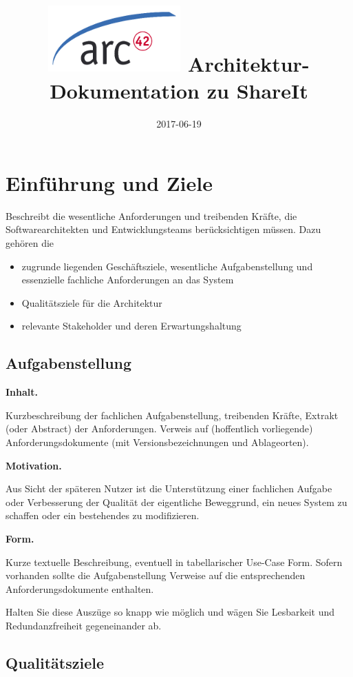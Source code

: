 \documentclass[]{article}
\title{\includegraphics{images/arc42-logo.png} Architektur-Dokumentation zu ShareIt}
\date{2017-06-19}
\begin{document}
\maketitle
\newpage
\section{Einführung und Ziele}\label{section-introduction-and-goals}

Beschreibt die wesentliche Anforderungen und treibenden Kräfte, die
Softwarearchitekten und Entwicklungsteams berücksichtigen müssen. Dazu
gehören die

\begin{itemize}
\item
  zugrunde liegenden Geschäftsziele, wesentliche Aufgabenstellung und
  essenzielle fachliche Anforderungen an das System
\item
  Qualitätsziele für die Architektur
\item
  relevante Stakeholder und deren Erwartungshaltung
\end{itemize}

\subsection{Aufgabenstellung}\label{_aufgabenstellung}

\textbf{Inhalt.}

Kurzbeschreibung der fachlichen Aufgabenstellung, treibenden Kräfte,
Extrakt (oder Abstract) der Anforderungen. Verweis auf (hoffentlich
vorliegende) Anforderungsdokumente (mit Versionsbezeichnungen und
Ablageorten).

\textbf{Motivation.}

Aus Sicht der späteren Nutzer ist die Unterstützung einer fachlichen
Aufgabe oder Verbesserung der Qualität der eigentliche Beweggrund, ein
neues System zu schaffen oder ein bestehendes zu modifizieren.

\textbf{Form.}

Kurze textuelle Beschreibung, eventuell in tabellarischer Use-Case Form.
Sofern vorhanden sollte die Aufgabenstellung Verweise auf die
entsprechenden Anforderungsdokumente enthalten.

Halten Sie diese Auszüge so knapp wie möglich und wägen Sie Lesbarkeit
und Redundanzfreiheit gegeneinander ab.

\subsection{Qualitätsziele}\label{_qualit_tsziele}
\end{document}
